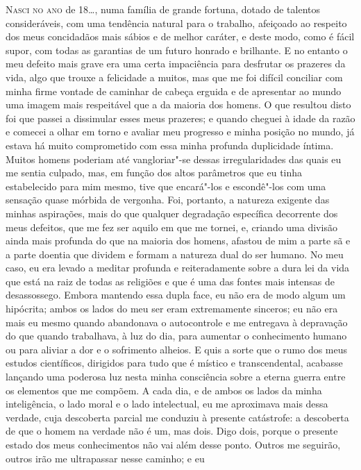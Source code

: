 \textsc{Nasci no ano} de 18\ldots{}, numa família de grande fortuna, dotado de
talentos consideráveis, com uma tendência natural para o trabalho,
afeiçoado ao respeito dos meus concidadãos mais sábios e de melhor
caráter, e deste modo, como é fácil supor, com todas as garantias de um
futuro honrado e brilhante.  E no entanto o meu defeito mais grave era
uma certa impaciência para desfrutar os prazeres da vida, algo que
trouxe a felicidade a muitos, mas que me foi difícil conciliar com
minha firme vontade de caminhar de cabeça erguida e de apresentar ao
mundo uma imagem mais respeitável que a da maioria dos homens.  O que
resultou disto foi que passei a dissimular esses meus prazeres; e
quando cheguei à idade da razão e comecei a olhar em torno e avaliar
meu progresso e minha posição no mundo, já estava há muito comprometido
com essa minha profunda duplicidade íntima.  Muitos homens poderiam até
vangloriar"-se dessas irregularidades das quais eu me sentia culpado,
mas, em função dos altos parâmetros que eu tinha estabelecido para mim
mesmo, tive que encará"-los e escondê"-los com uma sensação quase mórbida
de vergonha.  Foi, portanto, a natureza exigente das minhas aspirações,
mais do que qualquer degradação específica decorrente dos meus
defeitos, que me fez ser aquilo em que me tornei, e, criando uma
divisão ainda mais profunda do que na maioria dos homens, afastou de
mim a parte sã e a parte doentia que dividem e formam a natureza dual
do ser humano.  No meu caso, eu era levado a meditar profunda e
reiteradamente sobre a dura lei da vida que está na raiz de todas as
religiões e que é uma das fontes mais intensas de desassossego.  Embora
mantendo essa dupla face, eu não era de modo algum um hipócrita; ambos
os lados do meu ser eram extremamente sinceros; eu não era mais eu
mesmo quando abandonava o autocontrole e me entregava à depravação do
que quando trabalhava, à luz do dia, para aumentar o conhecimento
humano ou para aliviar a dor e o sofrimento alheios.  E quis a sorte
que o rumo dos meus estudos científicos, dirigidos para tudo que  é
místico e transcendental, acabasse lançando uma poderosa luz nesta
minha consciência sobre a eterna guerra entre os elementos que me
compõem.  A cada dia, e de ambos os lados da minha inteligência, o lado
moral e o lado intelectual, eu me aproximava mais dessa verdade, cuja
descoberta parcial me conduziu à presente catástrofe: a descoberta de
que o homem na verdade não é um, mas dois.  Digo dois, porque o
presente estado  dos meus conhecimentos não vai além desse ponto. 
Outros me seguirão, outros irão me ultrapassar nesse caminho; e eu
